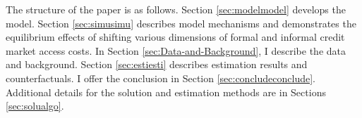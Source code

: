 The structure of the paper is as follows. Section \ref{sec:modelmodel} develops the model. Section \ref{sec:simusimu} describes model mechanisms and demonstrates the equilibrium effects of shifting various  dimensions of formal and informal credit market access costs. In Section \ref{sec:Data-and-Background}, I describe the data and background. Section \ref{sec:estiesti} describes estimation results and counterfactuals. I offer the conclusion in Section \ref{sec:concludeconclude}. Additional details for the solution and estimation methods are in Sections \ref{sec:solualgo}.
